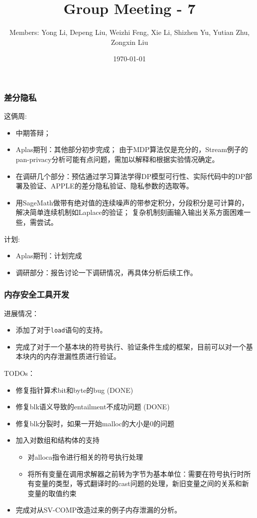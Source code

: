 \documentclass[aspectratio=1610, 13pt]{beamer}
\title{Group Meeting - 7}
\date{\today}
\author{Members: Yong Li, Depeng Liu, Weizhi Feng, Xie Li, Shizhen Yu, Yutian Zhu, Zongxin Liu}
\begin{document}
\maketitle
\begin{frame}\frametitle{差分隐私}
这俩周:
\begin{itemize}
  \item 中期答辩；
  \item Aplas期刊：其他部分初步完成；
  由于MDP算法仅是充分的，Stream例子的pan-privacy分析可能有点问题，需加以解释和根据实验情况确定。
  \item 在调研几个部分：预估通过学习算法学得DP模型可行性、实际代码中的DP部署及验证、APPLE的差分隐私验证、隐私参数的选取等。
  \item 用SageMath做带有绝对值的连续噪声的带参定积分，分段积分是可计算的，解决简单连续机制如Laplace的验证；
  复杂机制刻画输入输出关系方面困难一些，需尝试。
\end{itemize}

计划:
\begin{itemize}
  \item Aplas期刊：计划完成
  \item 调研部分：报告讨论一下调研情况，再具体分析后续工作。
\end{itemize}
\end{frame}

\begin{frame}\frametitle{内存安全工具开发}

进展情况：
\begin{itemize}
\item 添加了对于\texttt{load}语句的支持。
\item 完成了对于一个基本块的符号执行、验证条件生成的框架，目前可以对一个基本块内的内存泄漏性质进行验证。
\end{itemize}
TODOs：
\begin{itemize}
\small
\item 修复指针算术bit和byte的bug (DONE)
\item 修复blk语义导致的entailment不成功问题 (DONE)
\item 修复blk分裂时，如果一开始malloc的大小是0的问题
\item 加入对数组和结构体的支持
\begin{itemize}
\item 对alloca指令进行相关的符号执行处理
\item 将所有变量在调用求解器之前转为字节为基本单位：需要在符号执行时所有变量的类型，等式翻译时的cast问题的处理，新旧变量之间的关系和新变量的取值约束
\end{itemize}

\item 完成对从SV-COMP改造过来的例子内存泄漏的分析。

\end{itemize}

\end{frame}
\end{document}
